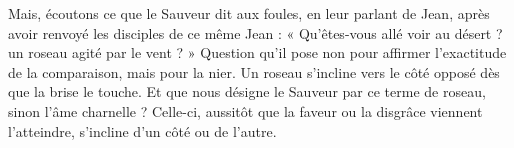 Mais, écoutons ce que le Sauveur dit aux foules, en leur parlant de Jean, après avoir renvoyé les disciples de ce même Jean : « Qu’êtes-vous allé voir au désert ? un roseau agité par le vent ? » Question qu’il pose non pour affirmer l’exactitude de la comparaison, mais pour la nier. Un roseau s’incline vers le côté opposé dès que la brise le touche. Et que nous désigne le Sauveur par ce terme de roseau, sinon l’âme charnelle ? Celle-ci, aussitôt que la faveur ou la disgrâce viennent l’atteindre, s’incline d’un côté ou de l’autre.
